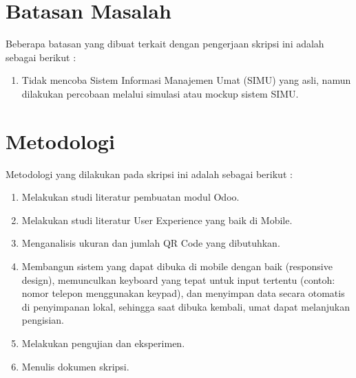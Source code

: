 \section{Batasan Masalah}
\label{sec:batasan}
Beberapa batasan yang dibuat terkait dengan pengerjaan skripsi ini adalah sebagai berikut :
\begin{enumerate}
	\item Tidak mencoba Sistem Informasi Manajemen Umat (SIMU) yang asli, namun dilakukan percobaan melalui simulasi atau mockup sistem SIMU.
\end{enumerate}


\section{Metodologi}
\label{sec:metlit}
Metodologi yang dilakukan pada skripsi ini adalah sebagai berikut :
\begin{enumerate}
	\item Melakukan studi literatur pembuatan modul Odoo.
	\item Melakukan studi literatur User Experience yang baik di Mobile.
	\item Menganalisis ukuran dan jumlah QR Code yang dibutuhkan.
	\item Membangun sistem yang dapat dibuka di mobile dengan baik (responsive design), memunculkan keyboard yang tepat untuk input tertentu (contoh: nomor telepon menggunakan keypad), dan menyimpan data secara otomatis di penyimpanan lokal, sehingga saat dibuka kembali, umat dapat melanjukan pengisian.
	\item Melakukan pengujian dan eksperimen.
	\item Menulis dokumen skripsi.
\end{enumerate}


